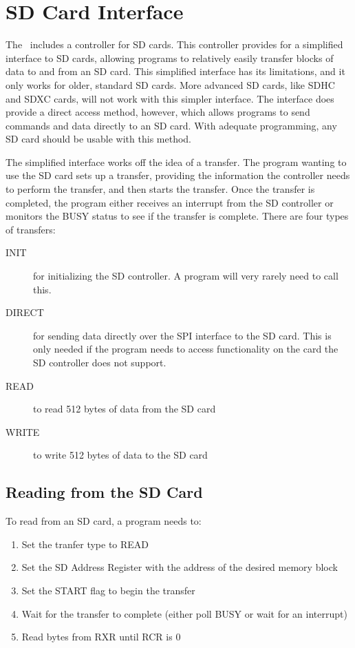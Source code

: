 \chapter{SD Card Interface}

The \jr\ includes a controller for SD cards. This controller provides for a simplified interface to SD cards, allowing programs to relatively easily transfer blocks of data to and from an SD card. This simplified interface has its limitations, and it only works for older, standard SD cards. More advanced SD cards, like SDHC and SDXC cards, will not work with this simpler interface. The interface does provide a direct access method, however, which allows programs to send commands and data directly to an SD card. With adequate programming, any SD card should be usable with this method.

The simplified interface works off the idea of a transfer. The program wanting to use the SD card sets up a transfer, providing the information the controller needs to perform the transfer, and then starts the transfer. Once the transfer is completed, the program either receives an interrupt from the SD controller or monitors the BUSY status to see if the transfer is complete. There are four types of transfers:

\begin{description}
    \item[INIT] for initializing the SD controller. A program will very rarely need to call this.

    \item[DIRECT] for sending data directly over the SPI interface to the SD card. This is only needed if the program needs to access functionality on the card the SD controller does not support.

    \item[READ] to read 512 bytes of data from the SD card

    \item[WRITE] to write 512 bytes of data to the SD card
\end{description}

\section{Reading from the SD Card}
To read from an SD card, a program needs to:
\begin{enumerate}
    \item Set the tranfer type to READ
    \item Set the SD Address Register with the address of the desired memory block
    \item Set the START flag to begin the transfer
    \item Wait for the transfer to complete (either poll BUSY or wait for an interrupt)
    \item Read bytes from RXR until RCR is 0
\end{enumerate}

